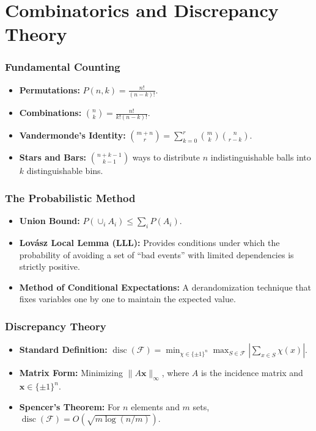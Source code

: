 \documentclass[11pt]{article}
\DeclareMathOperator{\disc}{disc}
\begin{document}
\hrulefill

\part{Combinatorics and Discrepancy Theory}

\section{Fundamental Counting}
\begin{itemize}
    \item \textbf{Permutations:} \( P(n, k) = \frac{n!}{(n-k)!} \).
    \item \textbf{Combinations:} \( \binom{n}{k} = \frac{n!}{k!(n-k)!} \).
    \item \textbf{Vandermonde's Identity:} \( \binom{m+n}{r} = \sum_{k=0}^r \binom{m}{k}\binom{n}{r-k} \).
    \item \textbf{Stars and Bars:} \( \binom{n+k-1}{k-1} \) ways to distribute \(n\) indistinguishable balls into \(k\) distinguishable bins.
\end{itemize}

\section{The Probabilistic Method}
\begin{itemize}
    \item \textbf{Union Bound:} \( P(\cup_i A_i) \le \sum_i P(A_i) \).
    \item \textbf{Lovász Local Lemma (LLL):} Provides conditions under which the probability of avoiding a set of ``bad events'' with limited dependencies is strictly positive.
    \item \textbf{Method of Conditional Expectations:} A derandomization technique that fixes variables one by one to maintain the expected value.
\end{itemize}

\section{Discrepancy Theory}
\begin{itemize}
    \item \textbf{Standard Definition:} \( \disc(\mathcal{F}) = \min_{\chi \in \{\pm 1\}^n} \max_{S \in \mathcal{F}} |\sum_{x \in S} \chi(x)| \).
    \item \textbf{Matrix Form:} Minimizing \( \|A\mathbf{x}\|_\infty \), where \(A\) is the incidence matrix and \(\mathbf{x} \in \{\pm 1\}^n\).
    \item \textbf{Spencer's Theorem:} For \(n\) elements and \(m\) sets, \( \disc(\mathcal{F}) = O(\sqrt{m \log(n/m)}) \).
\end{itemize}
\end{document}
